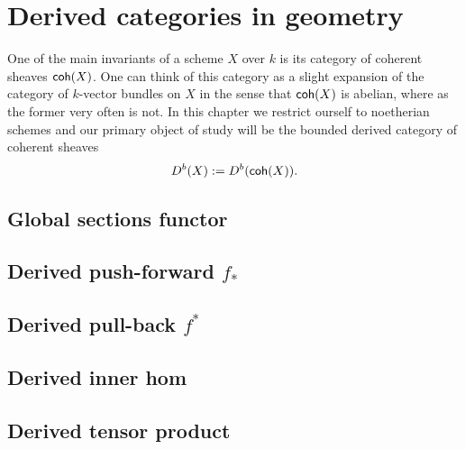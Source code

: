 \section{Derived categories in geometry}

One of the main invariants of a scheme $X$ over $k$ is its category of coherent sheaves $\textsf{coh}(X)$. One can think of this category as a slight expansion of the category of $k$-vector bundles on $X$ in the sense that $\textsf{coh}(X)$ is abelian, where as the former very often is not. In this chapter we restrict ourself to noetherian schemes and our primary object of study will be the bounded derived category of coherent sheaves
\[
    D^b(X) := D^b(\textsf{coh}(X)).
\]

\subsection{Global sections functor}
\subsection{Derived push-forward $f_*$}
\subsection{Derived pull-back $f^*$}
\subsection{Derived inner hom}
\subsection{Derived tensor product }
